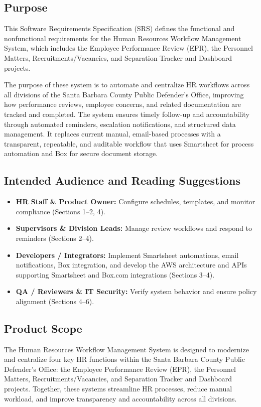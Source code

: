 \documentclass[12pt]{article}
\begin{document}
\subsection{Purpose}

This Software Requirements Specification (SRS) defines the functional and nonfunctional requirements for the Human Resources Workflow Management System, which includes the Employee Performance Review (EPR), the Personnel Matters, Recruitments/Vacancies, and Separation Tracker and Dashboard projects. 

The purpose of these system is to automate and centralize HR workflows across all divisions of the Santa Barbara County Public Defender’s Office, improving how performance reviews, employee concerns, and related documentation are tracked and completed. The system ensures timely follow-up and accountability through automated reminders, escalation notifications, and structured data management. It replaces current manual, email-based processes with a transparent, repeatable, and auditable workflow that uses Smartsheet for process automation and Box for secure document storage.

\subsection{Intended Audience and Reading Suggestions}

\begin{itemize}
  \item \textbf{HR Staff \& Product Owner:} Configure schedules, templates, and monitor compliance (Sections 1–2, 4).
  \item \textbf{Supervisors \& Division Leads:} Manage review workflows and respond to reminders (Sections 2–4).
  \item \textbf{Developers / Integrators:} Implement Smartsheet automations, email notifications, Box integration, and develop the AWS architecture and APIs supporting Smartsheet and Box.com integrations (Sections 3–4).
  \item \textbf{QA / Reviewers \& IT Security:} Verify system behavior and ensure policy alignment (Sections 4–6).
\end{itemize}

\subsection{Product Scope}

The Human Resources Workflow Management System is designed to modernize and centralize four key HR functions within the Santa Barbara County Public Defender’s Office: the Employee Performance Review (EPR), the Personnel Matters, Recruitments/Vacancies, and Separation Tracker and Dashboard projects. Together, these systems streamline HR processes, reduce manual workload, and improve transparency and accountability across all divisions.
\end{document}
